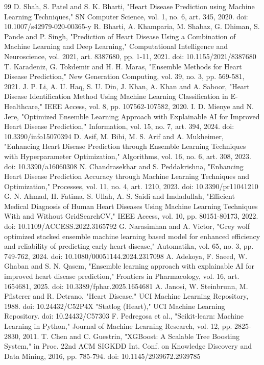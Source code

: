 \documentclass[conference,a4paper,10pt]{IEEEtran}
\begin{document}
\begin{thebibliography}{99}
 D. Shah, S. Patel and S. K. Bharti, "Heart Disease Prediction using Machine Learning Techniques," SN Computer Science, vol. 1, no. 6, art. 345, 2020. doi: 10.1007/s42979-020-00365-y
 R. Bharti, A. Khamparia, M. Shabaz, G. Dhiman, S. Pande and P. Singh, "Prediction of Heart Disease Using a Combination of Machine Learning and Deep Learning," Computational Intelligence and Neuroscience, vol. 2021, art. 8387680, pp. 1-11, 2021. doi: 10.1155/2021/8387680
 T. Karadeniz, G. Tokdemir and H. H. Maras, "Ensemble Methods for Heart Disease Prediction," New Generation Computing, vol. 39, no. 3, pp. 569-581, 2021.
 J. P. Li, A. U. Haq, S. U. Din, J. Khan, A. Khan and A. Saboor, "Heart Disease Identification Method Using Machine Learning Classification in E-Healthcare," IEEE Access, vol. 8, pp. 107562-107582, 2020.
 I. D. Mienye and N. Jere, "Optimized Ensemble Learning Approach with Explainable AI for Improved Heart Disease Prediction," Information, vol. 15, no. 7, art. 394, 2024. doi: 10.3390/info15070394
 D. Asif, M. Bibi, M. S. Arif and A. Mukheimer, "Enhancing Heart Disease Prediction through Ensemble Learning Techniques with Hyperparameter Optimization," Algorithms, vol. 16, no. 6, art. 308, 2023. doi: 10.3390/a16060308
 N. Chandrasekhar and S. Peddakrishna, "Enhancing Heart Disease Prediction Accuracy through Machine Learning Techniques and Optimization," Processes, vol. 11, no. 4, art. 1210, 2023. doi: 10.3390/pr11041210
 G. N. Ahmad, H. Fatima, S. Ullah, A. S. Saidi and Imdadullah, "Efficient Medical Diagnosis of Human Heart Diseases Using Machine Learning Techniques With and Without GridSearchCV," IEEE Access, vol. 10, pp. 80151-80173, 2022. doi: 10.1109/ACCESS.2022.3165792
 G. Narasimhan and A. Victor, "Grey wolf optimized stacked ensemble machine learning based model for enhanced efficiency and reliability of predicting early heart disease," Automatika, vol. 65, no. 3, pp. 749-762, 2024. doi: 10.1080/00051144.2024.2317098
 A. Adekoya, F. Saeed, W. Ghaban and S. N. Qasem, "Ensemble learning approach with explainable AI for improved heart disease prediction," Frontiers in Pharmacology, vol. 16, art. 1654681, 2025. doi: 10.3389/fphar.2025.1654681
 A. Janosi, W. Steinbrunn, M. Pfisterer and R. Detrano, "Heart Disease," UCI Machine Learning Repository, 1988. doi: 10.24432/C52P4X
 "Statlog (Heart)," UCI Machine Learning Repository. doi: 10.24432/C57303
 F. Pedregosa et al., "Scikit-learn: Machine Learning in Python," Journal of Machine Learning Research, vol. 12, pp. 2825-2830, 2011.
 T. Chen and C. Guestrin, "XGBoost: A Scalable Tree Boosting System," in Proc. 22nd ACM SIGKDD Int. Conf. on Knowledge Discovery and Data Mining, 2016, pp. 785-794. doi: 10.1145/2939672.2939785
\end{thebibliography}
\end{document}

